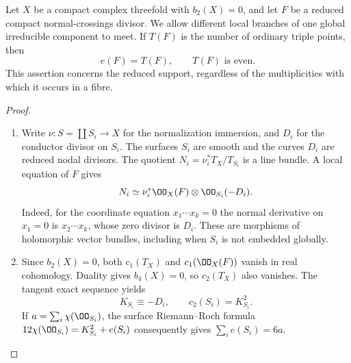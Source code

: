 \begin{proposition}[P4.6]\hypertarget{tag-02XY}{}\label{night:P4.6}\label{stmt:P4.6}

Let $X$ be a compact complex threefold with $b_2(X)=0$, and let $F$ be a
reduced compact normal-crossings divisor. We allow different local
branches of one global irreducible component to meet. If $T(F)$ is the
number of ordinary triple points, then
\[
 e(F)=T(F),\qquad T(F)\text{ is even}.
\]
This assertion concerns the reduced support, regardless of the
multiplicities with which it occurs in a fibre.
\end{proposition}
\begin{proof}

\begin{enumerate}[label={$\langle1\rangle$\arabic*.},leftmargin=*]
\item Write $\nu:S=\coprod S_i\to X$ for the normalization immersion, and $D_i$
for the conductor divisor on $S_i$. The surfaces $S_i$ are smooth and
the curves $D_i$ are reduced nodal divisors. The quotient
$N_i=\nu_i^*T_X/T_{S_i}$ is a line bundle. A local equation of $F$ gives
\[
 N_i\simeq \nu_i^*\OO_X(F)\otimes\OO_{S_i}(-D_i).
\]
Indeed, for the coordinate equation $x_1\cdots x_k=0$ the normal
derivative on $x_1=0$ is $x_2\cdots x_k$, whose zero divisor is $D_i$.
These are morphisms of holomorphic vector bundles, including when
$S_i$ is not embedded globally.

\item Since $b_2(X)=0$, both $c_1(T_X)$ and $c_1(\OO_X(F))$ vanish in real
cohomology. Duality gives $b_4(X)=0$, so $c_2(T_X)$ also vanishes. The
tangent exact sequence yields
\[
 K_{S_i}\equiv-D_i,\qquad c_2(S_i)=K_{S_i}^2.
\]
If $a=\sum_i\chi(\OO_{S_i})$, the surface Riemann--Roch formula
$12\chi(\OO_{S_i})=K_{S_i}^2+e(S_i)$ consequently gives
$\sum_i e(S_i)=6a$.


\end{enumerate}
\end{proof}
